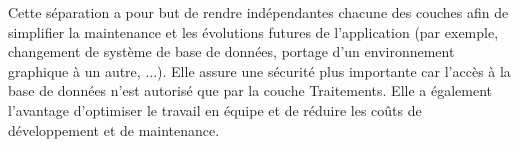 Cette séparation a pour but de rendre indépendantes chacune des couches afin de simplifier la maintenance et les évolutions futures de l'application (par exemple, changement de système de base de données, portage d'un environnement graphique à un autre, ...).
Elle assure une sécurité plus importante car l'accès à la base de données n'est autorisé que par la couche Traitements.
Elle a également l'avantage d'optimiser le travail en équipe et de réduire les coûts de développement et de maintenance.

